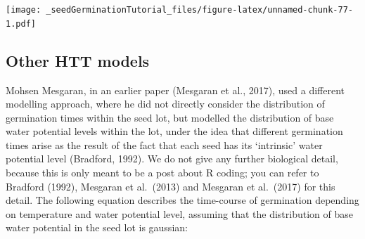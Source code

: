 \documentclass[
]{book}
\newenvironment{Shaded}{\begin{snugshade}}{\end{snugshade}}
\newcommand{\AttributeTok}[1]{\textcolor[rgb]{0.77,0.63,0.00}{#1}}
\newcommand{\FunctionTok}[1]{\textcolor[rgb]{0.00,0.00,0.00}{#1}}
\newcommand{\NormalTok}[1]{#1}
\newcommand{\OtherTok}[1]{\textcolor[rgb]{0.56,0.35,0.01}{#1}}
\newcommand{\SpecialCharTok}[1]{\textcolor[rgb]{0.00,0.00,0.00}{#1}}
\newcommand{\StringTok}[1]{\textcolor[rgb]{0.31,0.60,0.02}{#1}}
\begin{document}
\begin{Shaded}
\end{Shaded}

\texttt{[image: \_seedGerminationTutorial\_files/figure-latex/unnamed-chunk-77-1.pdf]}

\hypertarget{other-htt-models}{%
\subsection{Other HTT models}\label{other-htt-models}}

Mohsen Mesgaran, in an earlier paper (Mesgaran et al., 2017), used a different modelling approach, where he did not directly consider the distribution of germination times within the seed lot, but modelled the distribution of base water potential levels within the lot, under the idea that different germination times arise as the result of the fact that each seed has its `intrinsic' water potential level (Bradford, 1992). We do not give any further biological detail, because this is only meant to be a post about R coding; you can refer to Bradford (1992), Mesgaran et al.~(2013) and Mesgaran et al.~(2017) for this detail. The following equation describes the time-course of germination depending on temperature and water potential level, assuming that the distribution of base water potential in the seed lot is gaussian:
\end{document}
